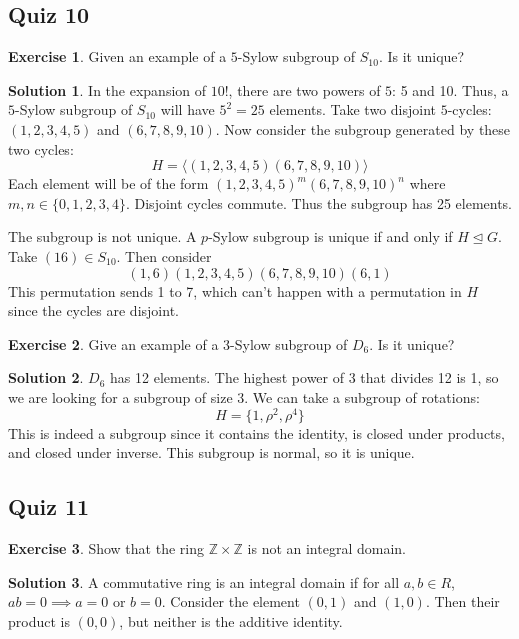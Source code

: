 \documentclass[12pt]{article}
\theoremstyle{definition}
\newcommand{\Z}{\mathbb{Z}}
\newtheorem{exercise}{\color{YellowOrange}Exercise}
\theoremstyle{definition}
\newtheorem{solution}{\color{Goldenrod}Solution}
\begin{document}
\subsection{Quiz 10}
\begin{exercise}
	Given an example of a $5$-Sylow subgroup of $S_{10}$. Is it unique?
\end{exercise}
\begin{solution}
	In the expansion of $10!$, there are two powers of $5$: 5 and 10. Thus, a $5$-Sylow subgroup of $S_{10}$ will have $5^2 = 25$ elements. Take two disjoint $5$-cycles: $(1,2,3,4,5)$ and $(6,7,8,9,10)$. Now consider the subgroup generated by these two cycles:
	\begin{equation}
		H = \langle (1,2,3,4,5)(6,7,8,9,10) \rangle
	\end{equation}
	Each element will be of the form $(1,2,3,4,5)^m(6,7,8,9,10)^n$ where $m,n \in \{0,1,2,3,4\}$. Disjoint cycles commute. Thus the subgroup has 25 elements. 

	The subgroup is not unique. A $p$-Sylow subgroup is unique if and only if $H \trianglelefteq G$. Take $(1 6) \in S_{10}$. Then consider
	\begin{equation}
		(1,6)(1,2,3,4,5)(6,7,8,9,10)(6,1)
	\end{equation}
	This permutation sends 1 to 7, which can't happen with a permutation in $H$ since the cycles are disjoint. 
\end{solution}

\begin{exercise}
	Give an example of a 3-Sylow subgroup of $D_6$. Is it unique?
\end{exercise}
\begin{solution}
	$D_6$ has 12 elements. The highest power of 3 that divides 12 is 1, so we are looking for a subgroup of size 3. We can take a subgroup of rotations:
	\begin{equation}
		H = \{1, \rho^2, \rho^4\}
	\end{equation}
	This is indeed a subgroup since it contains the identity, is closed under products, and closed under inverse. This subgroup is normal, so it is unique. 
\end{solution}

\subsection{Quiz 11}

\begin{exercise}
	Show that the ring $\Z \times \Z$ is not an integral domain.
\end{exercise}
\begin{solution}
	A commutative ring is an integral domain if for all $a,b \in R$, $ab=0 \implies a=0 \text{ or } b=0$. Consider the element $(0,1)$ and $(1,0)$. Then their product is $(0,0)$, but neither is the additive identity.
\end{solution}
\end{document}
